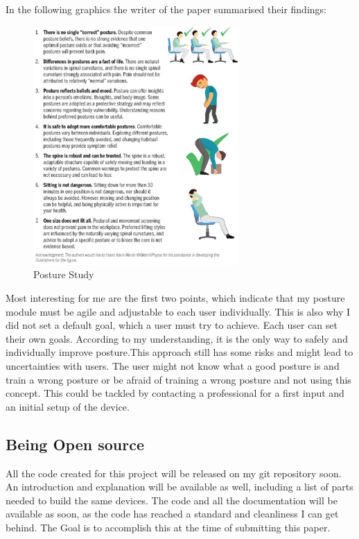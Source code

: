In the following graphics the writer of the paper summarised their findings:
\begin{figure}[h]
  \begin{center}
\includegraphics[width=0.7\textwidth]{images/jospt-562-fig001.jpg}
  \end{center}
  \caption{Posture Study \cite{SitUpSt77:online}}
  \label{fig:Posture Study}
\end{figure}

Most interesting for me are the first two points, which indicate that my posture module must be agile and adjustable to each user individually. This is also why I did not set a default goal, which a user must try to achieve. Each user can set their own goals. According to my understanding, it is the only way to safely and individually improve posture.This approach still has some risks and might lead to uncertainties with users. 
The user might not know what a good posture is and train a wrong posture or be afraid of training a wrong posture and not using this concept. This could be tackled by contacting a professional for a first input and an initial setup of the device.

\subsection{Being Open source}

All the code created for this project will be released on my git repository soon. An introduction and explanation will be available as well, including a list of parts needed to build the same devices. The code and all the documentation will be available as soon, as the code has reached a standard and cleanliness I can get behind. The Goal is to accomplish this at the time of submitting this paper.

